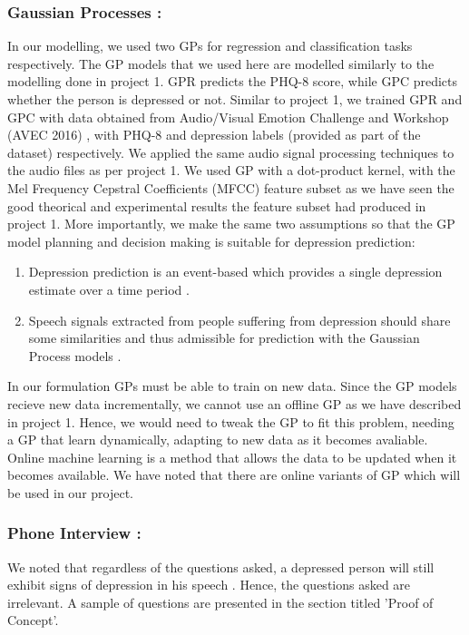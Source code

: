 \documentclass{article}
\begin{document}
	\subsubsection{Gaussian Processes :}
	In our modelling, we used two GPs for regression and classification tasks respectively. 
	The GP models that we used here are modelled similarly to the modelling done in project 1. 
	GPR predicts the PHQ-8 score, while GPC predicts whether the person is depressed or not. 
	Similar to project 1, we trained GPR and GPC with data obtained from Audio/Visual Emotion Challenge and Workshop (AVEC 2016) \cite{avec2016}, with PHQ-8 and depression labels (provided as part of the dataset) respectively. 
	We applied the same audio signal processing techniques to the audio files as per project 1. 
	We used GP with a dot-product kernel, with the Mel Frequency Cepstral Coefficients (MFCC) feature subset as we have seen the good theorical and experimental results the feature subset had produced in project 1. 
	More importantly, we make the same two assumptions so that the GP model planning and decision making is suitable for depression prediction:
	\begin{enumerate}
		\item Depression prediction is an event-based which provides a single depression estimate over a time period \cite{Valstar2016}.
		\item Speech signals extracted from people suffering from depression should share some similarities and thus admissible for prediction with the Gaussian Process models \cite{Cummins2015}.
	\end{enumerate}
	In our formulation GPs must be able to train on new data. 
	Since the GP models recieve new data incrementally, we cannot use an offline GP as we have described in project 1. 
	Hence, we would need to tweak the GP to fit this problem, needing a GP that learn dynamically, adapting to new data as it becomes avaliable. 
	Online machine learning is a method that allows the data to be updated when it becomes available. 
	We have noted that there are online variants of GP which will be used in our project.
	
	\subsubsection{Phone Interview :}
	We noted that regardless of the questions asked, a depressed person will still exhibit signs of depression in his speech \cite{jad2008}. 
	Hence, the questions asked are irrelevant. 
	A sample of questions are presented in the section titled 'Proof of Concept'.
\end{document}

